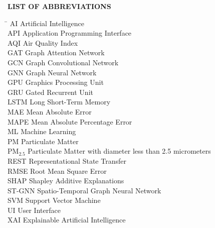 
\renewcommand{\contentsname}{TABLE OF CONTENTS}

\renewcommand{\listfigurename}{LIST OF FIGURES}

\renewcommand{\listtablename}{LIST OF TABLES}

\tableofcontents
\listoffigures
\listoftables

\clearpage
{}
{}
\begingroup
\raggedright
\normalsize
\noindent\textbf{LIST OF ABBREVIATIONS}\par
\vspace{-0.45cm}

\begin{tabbing}
\hspace{0.95in}\=\kill
AI \> Artificial Intelligence\\
API \> Application Programming Interface\\
AQI \> Air Quality Index\\
GAT \> Graph Attention Network\\
GCN \> Graph Convolutional Network\\
GNN \> Graph Neural Network\\
GPU \> Graphics Processing Unit\\
GRU \> Gated Recurrent Unit\\
LSTM \> Long Short-Term Memory\\
MAE \> Mean Absolute Error\\
MAPE \> Mean Absolute Percentage Error\\
ML \> Machine Learning\\
PM \> Particulate Matter\\
PM$_{2.5}$ \> Particulate Matter with diameter less than 2.5 micrometers\\
REST \> Representational State Transfer\\
RMSE \> Root Mean Square Error\\
SHAP \> Shapley Additive Explanations\\
ST-GNN \> Spatio-Temporal Graph Neural Network\\
SVM \> Support Vector Machine\\
UI \> User Interface\\
XAI \> Explainable Artificial Intelligence
\end{tabbing}
\endgroup
\clearpage


